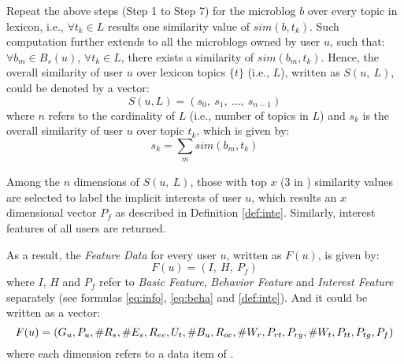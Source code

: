  Repeat the above steps (Step 1 to Step 7) for the microblog $b$ over every topic in lexicon, i.e., $\forall t_k \in L$ results one similarity value of $sim(b, t_k)$.
Such computation further extends to all the microblogs owned by user $u$, such that:
$\forall b_m \in B_s(u)$, $\forall t_k \in L$, there exists a similarity of $sim(b_m, t_k)$.
Hence, the overall similarity of user $u$ over lexicon topics $\{t\}$ (i.e., $L$), written as $S(u,\ L)$, could be denoted by a vector:
\begin{equation}
\label{eq:simul}
S(u, L) = (s_0,\ s_1,\ ...,\ s_{n-1})
\end{equation}
where $n$ refers to the cardinality of $L$ (i.e., number of topics in $L$) and $s_k$ is the overall similarity of user $u$ over topic $t_k$, which is given by:
\begin{equation}
\label{eq:simul-2}
s_k = \sum_{\substack{m}} sim(b_m, t_k)
\end{equation}

Among the $n$ dimensions of $S(u,\ L)$, those with top $x$ (3 in \sys{}) similarity values are selected to label the implicit interests of user $u$, which results an $x$ dimensional vector $P_f$ as described in Definition \ref{def:inte}.
Similarly, interest features of all users are returned.

As a result, the \textit{Feature Data} for every user $u$, written as $F(u)$, is given by:
\begin{equation}
\label{eq:fu}
	F(u) = (I,\ H,\ P_f)
\end{equation}
where $I$, $H$ and $P_f$ refer to \textit{Basic Feature}, \textit{Behavior Feature} and \textit{Interest Feature} separately (see formulas \ref{eq:info}, \ref{eq:beha} and \ref{def:inte}).
And it could be written as a vector:
\begin{equation}
\label{eq:fu-flat}
	F(u) = (G_u, P_u, \#R_s, \#E_s, R_{ee}, U_t, \#B_u, R_{oc},\\
    \#W_r, P_{rt}, P_{rg}, \#W_t, P_{tt}, P_{tg}, P_f)
\end{equation}
where each dimension refers to a data item of \sys{}.

